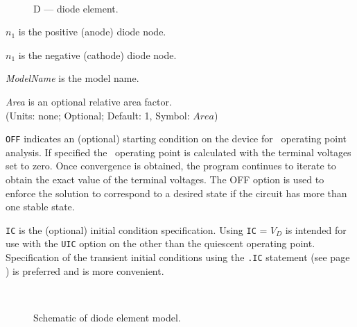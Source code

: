 \begin{figure}[h]
\centering
\ \epsfxsize=1.5in
\caption{D --- diode element.}
\end{figure}



\begin{widelist}
\item[{\it $n_1$}] is the positive (anode) diode node.
\item[{\it $n_1$}] is the negative (cathode) diode node.
\item[{\it ModelName}]  is  the  model name.
\item[{\it Area}] is an optional relative area factor.\\
               (Units: none; Optional; Default: 1, Symbol: $Area$)
\item[{\tt OFF}] indicates an (optional) starting  condition  on  the
device  for  \dc\ operating point analysis.
If specified the \dc\ operating point is calculated with the terminal voltages
set to zero.  Once convergence is obtained, the
program continues to iterate to obtain the exact  value of
the  terminal  voltages.  The OFF option is used to enforce the solution
to  correspond  to  a  desired  state if the circuit has more than one stable
state.
\item[{\tt IC}]  is the (optional)  initial  condition
specification.  Using  {\tt IC} = $V_D$ is intended for use with the {\tt UIC}
option on the other than the quiescent operating point.
Specification of the transient initial conditions using the {\tt .IC}
statement (see page \pageref{.ICstatement}) is preferred and is more
convenient.
\end{widelist}



\begin{figure}[h]
\centering
\ \epsfxsize=1in
\caption{Schematic of diode element model.}
\end{figure}

